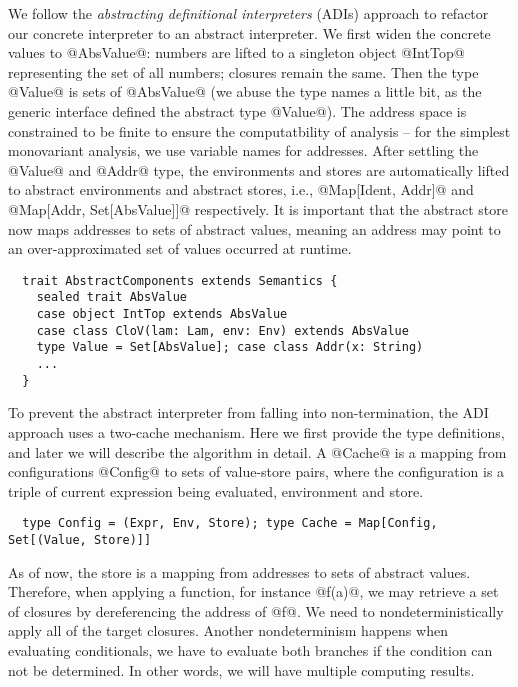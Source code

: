 We follow the \textit{abstracting definitional interpreters} (ADIs) approach
\cite{DBLP:journals/pacmpl/DaraisLNH17} to refactor our concrete interpreter to
an abstract interpreter. We first widen the concrete values to @AbsValue@: numbers
are lifted to a singleton object @IntTop@ representing the set of all numbers;
closures remain the same. Then the type @Value@ is sets of @AbsValue@ (we abuse
the type names a little bit, as the generic interface defined the abstract type
@Value@).
The address space is constrained to be finite to ensure the computatbility of
analysis -- for the simplest monovariant analysis, we use variable names for
addresses. After settling the @Value@ and @Addr@ type, the environments and
stores are automatically lifted to abstract environments and abstract stores,
i.e., @Map[Ident, Addr]@ and @Map[Addr, Set[AbsValue]]@ respectively.
It is important that the abstract store now maps addresses to sets of abstract
values, meaning an address may point to an over-approximated set of values
occurred at runtime.

\begin{lstlisting}
  trait AbstractComponents extends Semantics {
    sealed trait AbsValue
    case object IntTop extends AbsValue
    case class CloV(lam: Lam, env: Env) extends AbsValue
    type Value = Set[AbsValue]; case class Addr(x: String)
    ...
  }
\end{lstlisting}

To prevent the abstract interpreter from falling into non-termination, the ADI
approach uses a two-cache mechanism. Here we first provide the type
definitions, and later we will describe the algorithm in detail. A @Cache@ is a
mapping from configurations @Config@ to sets of value-store pairs, where the
configuration is a triple of current expression being evaluated, environment and
store.

\begin{lstlisting}
  type Config = (Expr, Env, Store); type Cache = Map[Config, Set[(Value, Store)]]
\end{lstlisting}

As of now, the store is a mapping from addresses to sets of abstract values.
Therefore, when applying a function, for instance @f(a)@, we may retrieve a set
of closures by dereferencing the address of @f@. We need to nondeterministically
apply all of the target closures.
Another nondeterminism happens when evaluating conditionals, we have to evaluate
both branches if the condition can not be determined. In other words, we will
have multiple computing results.

